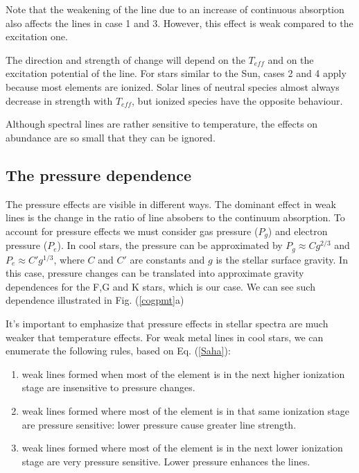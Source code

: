 \documentclass[dvips,12pt,a4paper]{report}
\begin{document}
{Note that the weakening of the line due to an increase of continuous absorption also affects the lines in case 1 and 3. However, this effect is weak compared to the excitation one.

The direction and strength of change will depend on the $T_{eff}$ and on the excitation potential of the line. For stars similar to the Sun, cases 2 and 4 apply because most elements are ionized. Solar lines of neutral species almost always decrease in strength with $T_{eff}$, but ionized species have the opposite behaviour. 

Although spectral lines are rather sensitive to temperature, the effects on abundance are so small that they can be ignored.

\subsection{The pressure dependence}

The pressure effects are visible in different ways. The dominant effect in weak lines is the change in the ratio of line absobers to the continuum absorption. To account for pressure effects we must consider gas pressure ($P_g$) and electron pressure ($P_e$). In cool stars, the pressure can be approximated by $P_g\approx C g^{2/3}$ and $P_e\approx C' g^{1/3}$, where $C$ and $C'$ are constants and $g$ is the stellar surface gravity. In this case, pressure changes can be translated into approximate gravity dependences for the F,G and K stars, which is our case. We can see such dependence illustrated in Fig. (\ref{cogpmt}a) 

It's important to emphasize that pressure effects in stellar spectra are much weaker that temperature effects. For weak metal lines in cool stars, we can enumerate the following rules, based on Eq. (\ref{Saha}):

\begin{enumerate}
 \item weak lines formed when most of the element is in the next higher ionization stage are insensitive to pressure changes.
\item weak lines formed where most of the element is in that same ionization stage are pressure sensitive: lower pressure cause greater line strength.
\item weak lines formed where most of the element is in the next lower ionization stage are very pressure sensitive. Lower pressure enhances the lines.
\end{enumerate}

}
\end{document}
